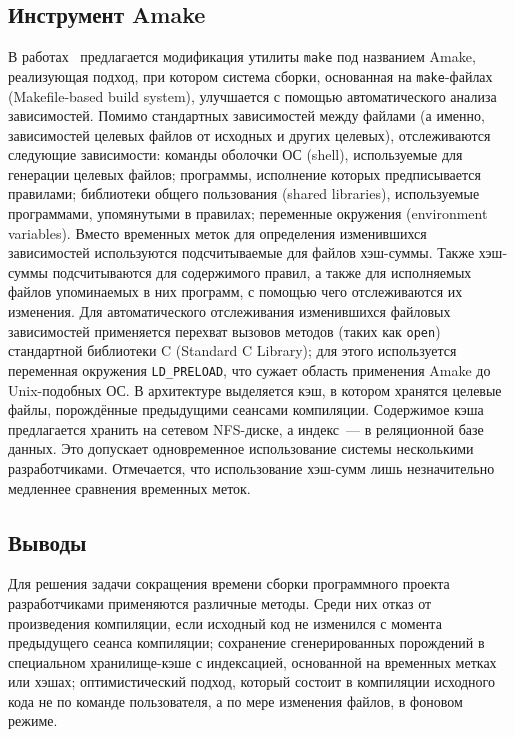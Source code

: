 \subsection{Инструмент Amake}
В работах~\cite{amake2012, amake2013} предлагается модификация утилиты \texttt{make} под названием Amake, реализующая подход, при котором система сборки, основанная на \texttt{make}-файлах (Makefile-based build system), улучшается с помощью автоматического анализа зависимостей. Помимо стандартных зависимостей между файлами (а именно, зависимостей целевых файлов от исходных и других целевых), отслеживаются следующие зависимости: команды оболочки ОС (shell), используемые для генерации целевых файлов; программы, исполнение которых предписывается правилами; библиотеки общего пользования (shared libraries), используемые программами, упомянутыми в правилах; переменные окружения (environment variables). Вместо временных меток для определения изменившихся зависимостей используются подсчитываемые для файлов хэш-суммы. Также хэш-суммы подсчитываются для содержимого правил, а также для исполняемых файлов упоминаемых в них программ, с помощью чего отслеживаются их изменения. Для автоматического отслеживания изменившихся файловых зависимостей применяется перехват вызовов методов (таких как \texttt{open}) стандартной библиотеки C (Standard C Library); для этого используется переменная окружения \texttt{LD\_PRELOAD}, что сужает область применения Amake до Unix-подобных ОС. В архитектуре выделяется кэш, в котором хранятся целевые файлы, порождённые предыдущими сеансами компиляции. Содержимое кэша предлагается хранить на сетевом NFS-диске, а индекс~--- в реляционной базе данных. Это допускает одновременное использование системы несколькими разработчиками. Отмечается, что использование хэш-сумм лишь незначительно медленнее сравнения временных меток.\\

\subsection{Выводы}
Для решения задачи сокращения времени сборки программного проекта разработчиками применяются различные методы. Среди них отказ от произведения компиляции, если исходный код не изменился с момента предыдущего сеанса компиляции; сохранение сгенерированных порождений в специальном хранилище-кэше с индексацией, основанной на временных метках или хэшах; оптимистический подход, который состоит в компиляции исходного кода не по команде пользователя, а по мере изменения файлов, в фоновом режиме.

